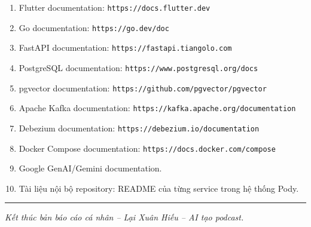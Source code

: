 \documentclass[14pt,a4paper,oneside]{extreport}
\begin{document}
\begin{enumerate}[leftmargin=2cm]
  \item Flutter documentation: \texttt{https://docs.flutter.dev}
  \item Go documentation: \texttt{https://go.dev/doc}
  \item FastAPI documentation: \texttt{https://fastapi.tiangolo.com}
  \item PostgreSQL documentation: \texttt{https://www.postgresql.org/docs}
  \item pgvector documentation: \texttt{https://github.com/pgvector/pgvector}
  \item Apache Kafka documentation: \texttt{https://kafka.apache.org/documentation}
  \item Debezium documentation: \texttt{https://debezium.io/documentation}
  \item Docker Compose documentation: \texttt{https://docs.docker.com/compose}
  \item Google GenAI/Gemini documentation.
  \item Tài liệu nội bộ repository: README của từng service trong hệ thống Pody.
\end{enumerate}

\vspace{1cm}
\noindent\rule{\textwidth}{0.4pt}

\noindent
\textit{Kết thúc bản báo cáo cá nhân -- Lại Xuân Hiếu -- AI tạo podcast.}
\end{document}
